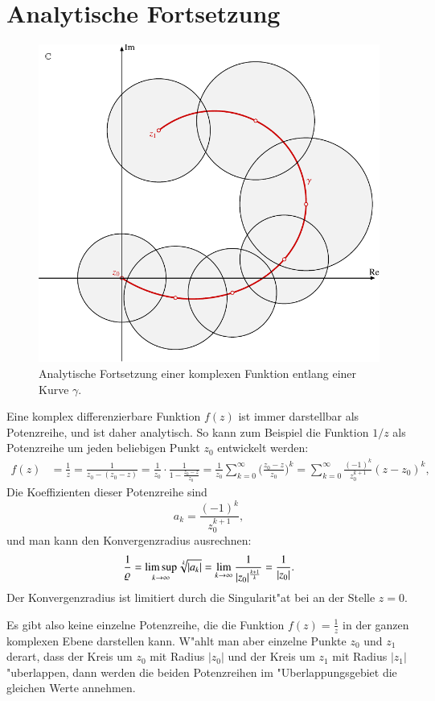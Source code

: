 \section{Analytische Fortsetzung}
\begin{figure}
\centering
\includegraphics{chapters/images/komplex-1.pdf}
\caption{Analytische Fortsetzung einer komplexen Funktion entlang einer
Kurve $\gamma$.
\label{komplex:fortsetzung}}
\end{figure}
Eine komplex differenzierbare Funktion $f(z)$ ist immer darstellbar als
Potenzreihe, und ist daher analytisch.
So kann zum Beispiel die Funktion $1/z$ als Potenzreihe um jeden 
beliebigen Punkt $z_0$ entwickelt werden:
\begin{align}
f(z)
&=
\frac1z
=
\frac1{z_0-(z_0-z)}
=
\frac1{z_0}\cdot
\frac1{1-\frac{z_0-z}{z_0}}
=
\frac1{z_0}\sum_{k=0}^{\infty} \biggl(\frac{z_0-z}{z_0}\biggr)^k
=
\sum_{k=0}^{\infty} \frac{(-1)^k}{z_0^{k+1}} (z-z_0)^k,
\label{komplex:1durchreihe}
\end{align}
Die Koeffizienten dieser Potenzreihe sind
\[
a_k=\frac{(-1)^k}{z_0^{k+1}},
\]
und man kann den Konvergenzradius ausrechnen:
\[
\frac1{\varrho}
=
\limsup_{k\to\infty} \root{k}\of{|a_k|} = \lim_{k\to\infty}\frac1{|z_0|^{\frac{k+1}{k}}}
=
\frac1{|z_0|}.
\]
Der Konvergenzradius ist limitiert durch die Singularit"at bei an der Stelle
$z=0$.

Es gibt also keine einzelne Potenzreihe, die die Funktion $f(z)=\frac1z$ in der
ganzen komplexen Ebene darstellen kann.
W"ahlt man aber einzelne Punkte $z_0$ und $z_1$ derart, dass der Kreis
um $z_0$ mit Radius $|z_0|$ und der Kreis um $z_1$ mit Radius $|z_1|$
"uberlappen, dann werden die beiden Potenzreihen im "Uberlappungsgebiet
die gleichen Werte annehmen.

